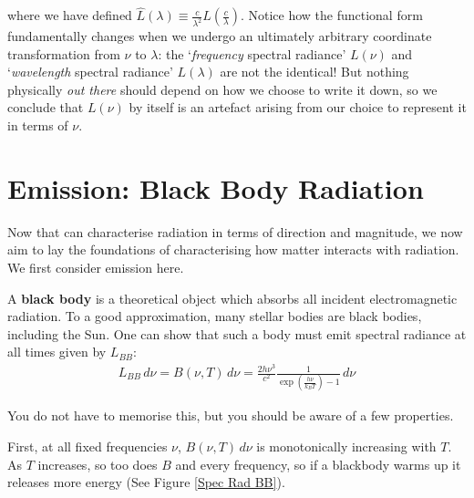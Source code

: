 \noindent where we have defined $\hat{L}(\lambda)\equiv\frac{c}{\lambda^2}L\left(\frac{c}{\lambda}\right)$. Notice how the functional form fundamentally changes when we undergo an ultimately arbitrary coordinate transformation from $\nu$ to $\lambda$: the `\textit{frequency} spectral radiance' $L(\nu)$ and `\textit{wavelength} spectral radiance' $L(\lambda)$ are not the identical! But nothing physically \textit{out there} should depend on how we choose to write it down, so we conclude that $L(\nu)$ by itself is an artefact arising from our choice to represent it in terms of $\nu$.

\section{Emission: Black Body Radiation}

Now that can characterise radiation in terms of direction and magnitude, we now aim to lay the foundations of characterising how matter interacts with radiation. We first consider emission here.

A \textbf{black body} is a theoretical object which absorbs all incident electromagnetic radiation. To a good approximation, many stellar bodies are black bodies, including the Sun. One can show that such a body must emit spectral radiance at all times given by $L_{BB}$:
\begin{align}
    \boxed{L_{BB}\,d\nu=B(\nu,T)\,d\nu=\frac{2h\nu^3}{c^2}\frac{1}{\exp\left( \frac{h\nu}{k_BT} \right)-1}\,d\nu}
\end{align}

\noindent You do not have to memorise this, but you should be aware of a few properties. 

First, at all fixed frequencies $\nu$, $B(\nu,T)\,d\nu$ is monotonically increasing with $T$. As $T$ increases, so too does $B$ and every frequency, so if a blackbody warms up it releases more energy (See Figure \ref{Spec Rad BB}).

